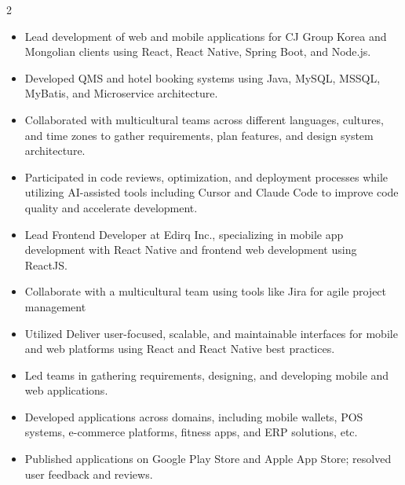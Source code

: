 \documentclass[10pt,a4paper,ragged2e,withhyper]{altacv}
\begin{document}
\begin{paracol}{2}

            \begin{itemize}
                \item Lead development of web and mobile applications for CJ Group Korea and Mongolian clients using React, React Native, Spring Boot, and Node.js.
                \item Developed QMS and hotel booking systems using Java, MySQL, MSSQL, MyBatis, and Microservice architecture.
                \item Collaborated with multicultural teams across different languages, cultures, and time zones to gather requirements, plan features, and design system architecture.
                \item Participated in code reviews, optimization, and deployment processes while utilizing AI-assisted tools including Cursor and Claude Code to improve code quality and accelerate development.
            \divider
            \end{itemize}

            \begin{itemize}
                \item Lead Frontend Developer at Edirq Inc., specializing in mobile app development with React Native and frontend web development using ReactJS.
                \item Collaborate with a multicultural team using tools like Jira for agile project management
                \item Utilized Deliver user-focused, scalable, and maintainable interfaces for mobile and web platforms using React and React Native best practices.
            \divider
            \end{itemize}

            \begin{itemize}
                \item Led teams in gathering requirements, designing, and developing mobile and web applications.
                \item Developed applications across domains, including mobile wallets, POS systems, e-commerce platforms, fitness apps, and ERP solutions, etc.
                \item Published applications on Google Play Store and Apple App Store; resolved user feedback and reviews.
            \divider
            \end{itemize}


\end{paracol}
\end{document}
